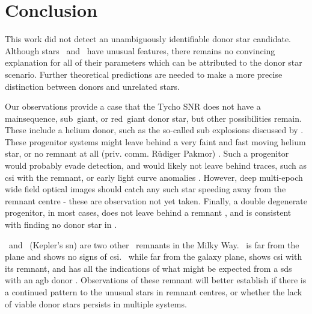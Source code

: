 \section{Conclusion}
\label{sec:sn1572_hires:conclusion}
This work did not detect an unambiguously identifiable donor star candidate. Although stars \starb\ and \starg\ have unusual features, there remains no convincing explanation for all of their parameters which can be attributed to the \gls{donor} star scenario. Further theoretical predictions are needed to make a more precise distinction between donors and unrelated stars. 
 
Our observations provide a case that the Tycho SNR does not have a \gls*{mainsequence}, sub~giant, or red~giant donor star, but other possibilities remain. These include a helium donor, such as the so-called sub  explosions discussed by \cite{1995ApJ...452...62L, 2010ApJ...714L..52S}. These progenitor systems might leave behind a very faint and fast moving helium star, or no remnant at all (priv. comm. R\"udiger Pakmor)
. Such a progenitor would probably evade detection, and would likely not leave behind traces, such as \gls{csi} with the remnant, or early light curve anomalies \citep{2010ApJ...708.1025K}. However, deep multi-epoch wide field optical images should catch any such star speeding away from the remnant centre - these are observation not yet taken.
 Finally, a double degenerate progenitor, in most cases, does not leave behind a remnant , and is consistent with finding no donor star in . 
 
\ and \ (Kepler's \gls*{sn}) are two other \snia\ remnants in the Milky Way. \ is far from the plane and shows no signs of \gls{csi}. \ while far from the galaxy plane, shows \gls{csi} with its remnant, and has all the indications of what might be expected from a \gls{sds} with an \gls{agb} donor \citep{2011arXiv1103.5487C}. Observations of these remnant will better establish if there is a continued pattern to the unusual stars in \snia remnant centres, or whether the lack of viable donor stars persists in multiple systems.



